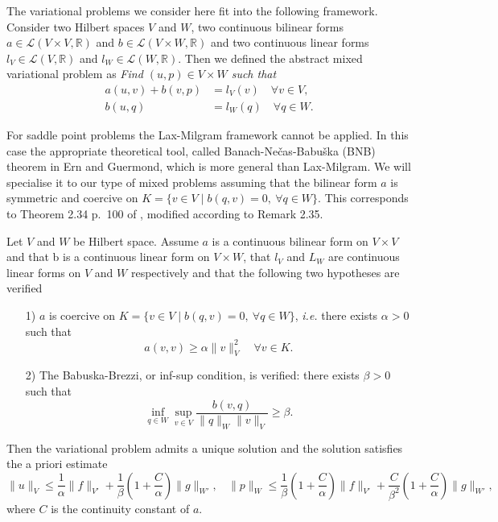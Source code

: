 The variational problems we consider here fit into the following framework. 
Consider two Hilbert spaces $V$ and $W$, two continuous bilinear forms
$a\in \mathcal{L}(V\times V, \mathbb{R})$ and $b\in \mathcal{L}(V\times W, \mathbb{R})$
and two continuous linear forms $l_V\in \mathcal{L}(V, \mathbb{R})$ and
$l_W\in \mathcal{L}(W, \mathbb{R})$.
Then we defined the abstract mixed variational problem as {\em Find $(u,p)\in V\times W$ such that}
\begin{align}
a(u,v) + b(v,p) &= l_V(v) \quad \forall v\in V, \label{eq:abs_var_mixed1}\\
b(u,q) &= l_W(q) \quad \forall q\in W.  \label{eq:abs_var_mixed2}
\end{align}

For saddle point problems the Lax-Milgram framework cannot be applied. In this case the appropriate theoretical tool, called Banach-Ne\v{c}as-Babu\v{s}ka (BNB) theorem in Ern and Guermond, which is more general than Lax-Milgram. We will specialise it to our type of mixed problems assuming that the bilinear form $a$ is symmetric and coercive on $K=\{v\in V\; | \; b(q,v)=0,~\forall q\in W\}$. This corresponds to Theorem 2.34 p.~100 of \cite{ern2004}, modified according to Remark 2.35.


\begin{theorem} Let $V$ and $W$ be Hilbert space. Assume $a$ is a continuous bilinear form on
$V\times V$ and that b is a continuous linear form on $V\times W$, that  $l_V$ and $L_W$ are continuous linear forms on $V$  and $W$ respectively and that the following two hypotheses are verified
\begin{itemize}
\item[1)]  $a$ is coercive on $K=\{v\in V\; |\; b(q,v)=0,~\forall q\in W\}$, \textit{i.e.} there exists $\alpha>0$ such that
$$a(v,v) \geq \alpha \|v\|^2_V \quad\forall v\in K.$$
\item[2)] The Babuska-Brezzi, or inf-sup condition, is verified:  there exists $\beta>0$ such that
$$ \inf_{q\in W} \sup_{v\in V} \frac{b(v,q)}{\|q\|_W\|v\|_V} \geq \beta.$$
\end{itemize}
Then the variational problem admits a unique solution and the solution satisfies the a priori estimate
$$\|u\|_V \leq \frac{1}{\alpha} \|f\|_{V'} + \frac{1}{\beta}(1+ \frac{C}{\alpha})  \|g\|_{W'}, ~~~~
\|p\|_W \leq \frac{1}{\beta}(1+ \frac{C}{\alpha})  \|f\|_{V'} + \frac{C}{\beta^2}(1+ \frac{C}{\alpha})  \|g\|_{W'},$$
where $C$ is the continuity constant of $a$.
\end{theorem}

